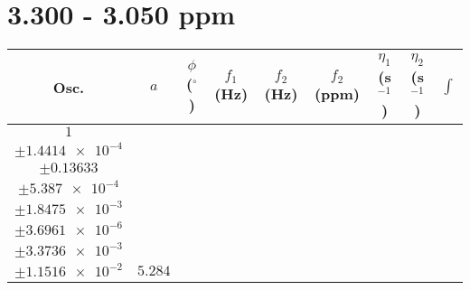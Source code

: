 \documentclass[8pt]{article}
\begin{document}
\section*{3.300 - 3.050 ppm}
\begin{longtable}[l]{c c c c c c c c c}
\toprule
Osc. & $a$ & $\phi$ ($^{\circ}$) & $f_1$ (Hz) & $f_2$ (Hz) & $f_2$ (ppm) & $\eta_1$ (s$^{-1}$) & $\eta_2$ (s$^{-1}$) & $\int$\\
\midrule
$\num{1}$ & \begin{tabular}[c]{@{}c@{}}$\num{6.0817e-2}$ \\ $\pm\num{1.4414e-4}$\end{tabular} & \begin{tabular}[c]{@{}c@{}}$\num{-0.67764}$ \\ $\pm\num{0.13633}$\end{tabular} & \begin{tabular}[c]{@{}c@{}}$\num{-10.342}$ \\ $\pm\num{5.387e-4}$\end{tabular} & \begin{tabular}[c]{@{}c@{}}$\num{1.5557e+3}$ \\ $\pm\num{1.8475e-3}$\end{tabular} & \begin{tabular}[c]{@{}c@{}}$\num{3.1123}$ \\ $\pm\num{3.6961e-6}$\end{tabular} & \begin{tabular}[c]{@{}c@{}}$\num{1.1769}$ \\ $\pm\num{3.3736e-3}$\end{tabular} & \begin{tabular}[c]{@{}c@{}}$\num{4.2196}$ \\ $\pm\num{1.1516e-2}$\end{tabular} & $\num{5.284}$\\

\end{longtable}
\end{document}

